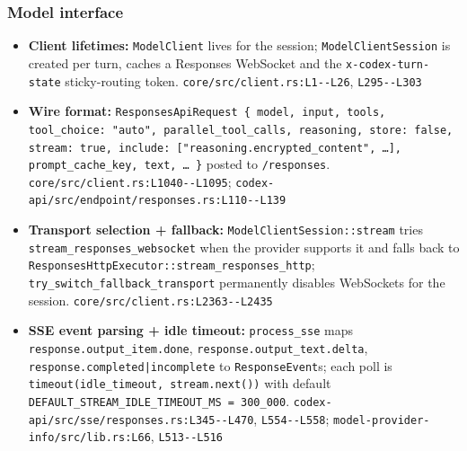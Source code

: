 \subsubsection*{Model interface}
\begin{itemize}
\item \textbf{Client lifetimes:} \texttt{ModelClient} lives for the session; \texttt{ModelClientSession} is created per turn, caches a Responses WebSocket and the \texttt{x-\allowbreak{}codex-\allowbreak{}turn-\allowbreak{}state} sticky-routing token. \texttt{core/\allowbreak{}src/\allowbreak{}client.\allowbreak{}rs:\allowbreak{}L1-\allowbreak{}-\allowbreak{}L26}, \texttt{L295-\allowbreak{}-\allowbreak{}L303}
\item \textbf{Wire format:} \texttt{ResponsesApiRequest \{ model, input, tools, tool\_\allowbreak{}choice:\allowbreak{} "auto", parallel\_\allowbreak{}tool\_\allowbreak{}calls, reasoning, store:\allowbreak{} false, stream:\allowbreak{} true, include:\allowbreak{} ["reasoning.\allowbreak{}encrypted\_\allowbreak{}content", \ldots{}], prompt\_\allowbreak{}cache\_\allowbreak{}key, text, \ldots{} \}} posted to \texttt{/\allowbreak{}responses}. \texttt{core/\allowbreak{}src/\allowbreak{}client.\allowbreak{}rs:\allowbreak{}L1040-\allowbreak{}-\allowbreak{}L1095}; \texttt{codex-\allowbreak{}api/\allowbreak{}src/\allowbreak{}endpoint/\allowbreak{}responses.\allowbreak{}rs:\allowbreak{}L110-\allowbreak{}-\allowbreak{}L139}
\item \textbf{Transport selection + fallback:} \texttt{ModelClientSession:\allowbreak{}:\allowbreak{}stream} tries \texttt{stream\_\allowbreak{}responses\_\allowbreak{}websocket} when the provider supports it and falls back to \texttt{ResponsesHttpExecutor:\allowbreak{}:\allowbreak{}stream\_\allowbreak{}responses\_\allowbreak{}http}; \texttt{try\_\allowbreak{}switch\_\allowbreak{}fallback\_\allowbreak{}transport} permanently disables WebSockets for the session. \texttt{core/\allowbreak{}src/\allowbreak{}client.\allowbreak{}rs:\allowbreak{}L2363-\allowbreak{}-\allowbreak{}L2435}
\item \textbf{SSE event parsing + idle timeout:} \texttt{process\_\allowbreak{}sse} maps \texttt{response.\allowbreak{}output\_\allowbreak{}item.\allowbreak{}done}, \texttt{response.\allowbreak{}output\_\allowbreak{}text.\allowbreak{}delta}, \texttt{response.\allowbreak{}completed|incomplete} to \texttt{ResponseEvent}s; each poll is \texttt{timeout(\allowbreak{}idle\_\allowbreak{}timeout, stream.\allowbreak{}next(\allowbreak{}))} with default \texttt{DEFAULT\_\allowbreak{}STREAM\_\allowbreak{}IDLE\_\allowbreak{}TIMEOUT\_\allowbreak{}MS = 300\_\allowbreak{}000}. \texttt{codex-\allowbreak{}api/\allowbreak{}src/\allowbreak{}sse/\allowbreak{}responses.\allowbreak{}rs:\allowbreak{}L345-\allowbreak{}-\allowbreak{}L470}, \texttt{L554-\allowbreak{}-\allowbreak{}L558}; \texttt{model-\allowbreak{}provider-\allowbreak{}info/\allowbreak{}src/\allowbreak{}lib.\allowbreak{}rs:\allowbreak{}L66}, \texttt{L513-\allowbreak{}-\allowbreak{}L516}

\end{itemize}
